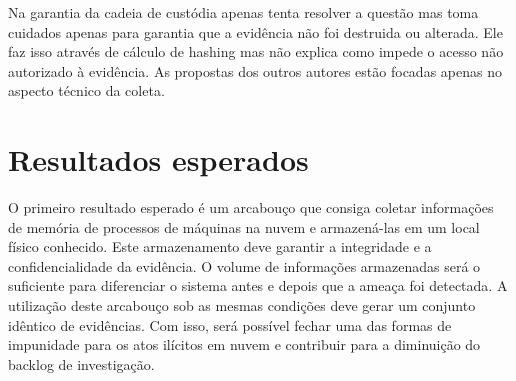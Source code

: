 \documentclass[12pt,				%
	openright,			%
	oneside,			%
	a4paper,			%
	english,			%
	brazil				%
	]{abntex2}
\begin{document}
Na garantia da cadeia de custódia apenas \cite{Sang2013} tenta resolver a questão mas toma cuidados apenas para  garantia que a evidência não foi destruida ou alterada. 
Ele faz isso através de cálculo de hashing mas não explica como impede o acesso não autorizado à evidência. As propostas dos outros autores estão focadas apenas no 
aspecto técnico da coleta.

\chapter{Resultados esperados} \label{chap:result}
O primeiro resultado esperado é um arcabouço que consiga coletar informações de memória de processos de máquinas na nuvem e armazená-las em um local físico conhecido.
Este armazenamento deve garantir a integridade e a confidencialidade da evidência. O volume de informações armazenadas será o suficiente para diferenciar o sistema antes 
e depois que a ameaça foi detectada. A utilização deste arcabouço sob as mesmas condições deve gerar um conjunto idêntico de evidências. Com isso, será possível fechar 
uma das formas de impunidade para os atos ilícitos em nuvem e contribuir para a diminuição do backlog de investigação.



\postextual

%  

\begin{comment}
\printindex
\end{comment}

\end{document}
